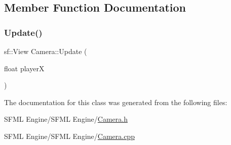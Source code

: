 \subsection{Member Function Documentation}
\hypertarget{class_camera_a261c43250d32bcc95b26f092225a9d2f}{}\label{class_camera_a261c43250d32bcc95b26f092225a9d2f} 
\subsubsection{\texorpdfstring{Update()}{Update()}}
{\footnotesize\ttfamily sf\+::\+View Camera\+::\+Update (\begin{DoxyParamCaption}\item[{float}]{playerX }\end{DoxyParamCaption})}



The documentation for this class was generated from the following files\+:\begin{DoxyCompactItemize}
\item 
S\+F\+M\+L Engine/\+S\+F\+M\+L Engine/\hyperlink{_camera_8h}{Camera.\+h}\item 
S\+F\+M\+L Engine/\+S\+F\+M\+L Engine/\hyperlink{_camera_8cpp}{Camera.\+cpp}\end{DoxyCompactItemize}
